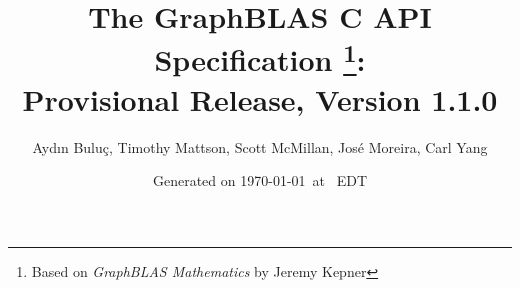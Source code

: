 \documentclass[11pt]{extbook}
\begin{document}
\linenumbers

\title{
The GraphBLAS C API Specification
\footnote{Based on \emph{GraphBLAS Mathematics} by Jeremy Kepner}: \\ 
{\large Provisional Release, Version 1.1.0}
}

\author{Ayd\i n Bulu\c{c}, Timothy Mattson, Scott McMillan, Jos\'e Moreira, Carl Yang}

\date{Generated on \today\ at \currenttime\ EDT}

\renewcommand{\array}[1]{\bm{#1}}
\renewcommand{\vector}[1]{{\bf #1}}
\renewcommand{\matrix}[1]{{\bf #1}}
\renewcommand{\arg}[1]{{\sf #1}}
\newcommand{\zip}{{\mbox{zip}}}
\newcommand{\zap}{{\mbox{zap}}}
\newcommand{\ewiseadd}{{\mbox{\bf ewiseadd}}}
\newcommand{\ewisemult}{{\mbox{\bf ewisemult}}}
\newcommand{\mxm}{{\mbox{\bf mxm}}}
\newcommand{\vxm}{{\mbox{\bf vxm}}}
\newcommand{\mxv}{{\mbox{\bf mxv}}}
\newcommand{\gpit}[1]{{\sf #1}}
\newcommand{\ie}{\emph{i.e.}}
\newcommand{\eg}{\emph{e.g.}}
\newcommand{\nan}{{\sf NaN}}
\newcommand{\nil}{{\bf nil}}
\newcommand{\ifif}{{\bf if}}
\newcommand{\ifthen}{{\bf then}}
\newcommand{\ifelse}{{\bf else}}
\newcommand{\ifendif}{{\bf endif}}
\newcommand{\zero}{{\bf 0}}
\newcommand{\one}{{\bf 1}}
\newcommand{\true}{{\sf true}}
\newcommand{\false}{{\sf false}}
\newcommand{\syntax}{{C Syntax}}

\newcommand{\Dinn}{\mbox{$D_{in}$}}
\newcommand{\Din}[1]{\mbox{$D_{in_{#1}}$}}
\newcommand{\Dout}{\mbox{$D_{out}$}}

\newcommand{\bDinn}{\mbox{$\mathbf{D}_{in}$}}
\newcommand{\bDin}[1]{\mbox{$\mathbf{D}_{in_{#1}}$}}
\newcommand{\bDout}{\mbox{$\mathbf{D}_{out}$}}


\newcommand{\aydin}[1]{}
\newcommand{\scott}[1]{}
\newcommand{\tim}[1]{}
\newcommand{\jose}[1]{}
\newcommand{\carl}[1]{}
\newcommand{\ajy}[1]{}


\renewcommand{\comment}[1]{{}}
\newcommand{\glossBegin}{\begin{itemize}}
\newcommand{\glossItem}[1]{\item \emph{#1}: }
\newcommand{\glossEnd}{\end{itemize}}
\end{document}
